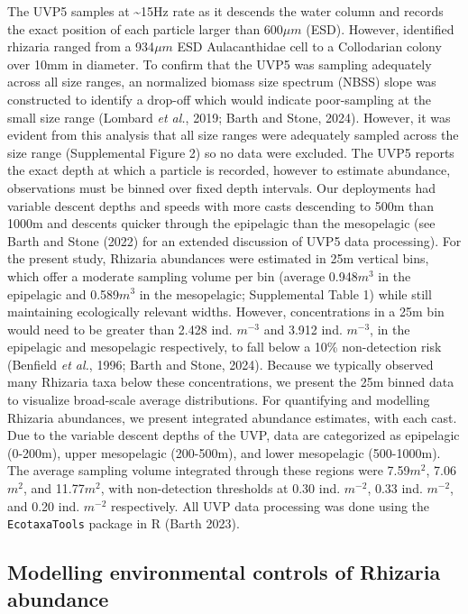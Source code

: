 \documentclass[
]{article}
\begin{document}
The UVP5 samples at \textasciitilde15Hz rate as it descends the water
column and records the exact position of each particle larger than
600\(\mu m\) (ESD). However, identified rhizaria ranged from a
934\(\mu m\) ESD Aulacanthidae cell to a Collodarian colony over 10mm in
diameter. To confirm that the UVP5 was sampling adequately across all
size ranges, an normalized biomass size spectrum (NBSS) slope was
constructed to identify a drop-off which would indicate poor-sampling at
the small size range (Lombard \emph{et al.}, 2019; Barth and Stone,
2024). However, it was evident from this analysis that all size ranges
were adequately sampled across the size range (Supplemental Figure 2) so
no data were excluded. The UVP5 reports the exact depth at which a
particle is recorded, however to estimate abundance, observations must
be binned over fixed depth intervals. Our deployments had variable
descent depths and speeds with more casts descending to 500m than 1000m
and descents quicker through the epipelagic than the mesopelagic (see
Barth and Stone (2022) for an extended discussion of UVP5 data
processing). For the present study, Rhizaria abundances were estimated
in 25m vertical bins, which offer a moderate sampling volume per bin
(average 0.948\(m^3\) in the epipelagic and 0.589\(m^3\) in the
mesopelagic; Supplemental Table 1) while still maintaining ecologically
relevant widths. However, concentrations in a 25m bin would need to be
greater than 2.428 ind. \(m^{-3}\) and 3.912 ind. \(m^{-3}\), in the
epipelagic and mesopelagic respectively, to fall below a 10\%
non-detection risk (Benfield \emph{et al.}, 1996; Barth and Stone,
2024). Because we typically observed many Rhizaria taxa below these
concentrations, we present the 25m binned data to visualize broad-scale
average distributions. For quantifying and modelling Rhizaria
abundances, we present integrated abundance estimates, with each cast.
Due to the variable descent depths of the UVP, data are categorized as
epipelagic (0-200m), upper mesopelagic (200-500m), and lower mesopelagic
(500-1000m). The average sampling volume integrated through these
regions were 7.59\(m^2\), 7.06\(m^2\), and 11.77\(m^2\), with
non-detection thresholds at 0.30 ind. \(m^{-2}\), 0.33 ind. \(m^{-2}\),
and 0.20 ind. \(m^{-2}\) respectively. All UVP data processing was done
using the \texttt{EcotaxaTools} package in R (Barth 2023).

\subsection{Modelling environmental controls of Rhizaria
abundance}\label{modelling-environmental-controls-of-rhizaria-abundance}
\end{document}
